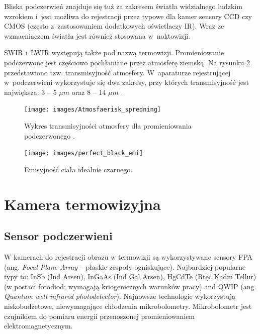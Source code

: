 Bliska podczerwień znajduje się tuż za zakresem światła widzialnego ludzkim wzrokiem i~jest możliwa do rejestracji przez typowe dla kamer sensory CCD czy CMOS (często z~zastosowaniem dodatkowych oświetlaczy IR). 
Wraz ze wzmacniaczem światła jest również stosowana w~noktowizji.

SWIR i~LWIR występują także pod nazwą termowizji. 
Promieniowanie podczerwone jest częściowo pochłaniane przez atmosferę ziemską. 
Na rysunku \ref{fig:atmosfera_int} przedstawiono tzw. transmisyjność atmosfery. 
W~aparaturze rejestrującej w~podczerwieni wykorzystuje się dwa zakresy, przy których transmisyjność jest największa: 3 -- 5 $\mu m$ oraz 8 -- 14 $\mu m$ \cite{niklaus2007mems}.


\begin{figure}
\centering
\texttt{[image: images/Atmosfaerisk\_spredning]}
\caption[Wykres transmisyjności atmosfery dla promieniowania podczerwonego ]{Wykres transmisyjności atmosfery dla promieniowania podczerwonego \cite{wiki:infrared}.}
\label{fig:perfect_black}
\end{figure}

\begin{figure}
\centering
\texttt{[image: images/perfect\_black\_emi]}
\caption[Emisyjność ciała idealnie czarnego]{Emisyjność ciała idealnie czarnego.}
\label{fig:atmosfera_int}
\end{figure}


\section{Kamera termowizyjna}

\subsection{Sensor podczerwieni}

W kamerach do rejestracji obrazu w termowizji są wykorzystywane sensory FPA (ang. \textit{Focal Plane Array} -- płaskie zespoły ogniskujące). 
Najbardziej popularne typy to: InSb (Ind Arsen), InGaAs (Ind Gal Arsen), HgCdTe (Rtęć Kadm Tellur) (w postaci fotodiod; wymagają kriogenicznych warunków pracy) and QWIP (ang. \textit{Quantum well infrared photodetector}). 
Najnowsze technologie wykorzystują niskobudżetowe, niewymagające chłodzenia mikrobolometry. Mikrobolometr jest czujnikiem do pomiaru energii przenoszonej promieniowaniem elektromagnetycznym.

